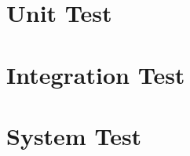 \documentclass[a4paper,bibtotoc,oneside]{scrbook}
\begin{document}
\chapter{Unit Test}




\chapter{Integration Test}




\chapter{System Test}

% 
\end{document}
